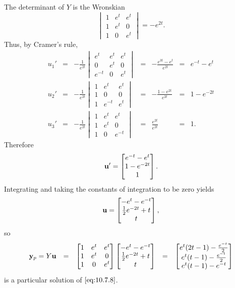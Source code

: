 \documentclass{ximera}
\begin{document}
\begin{example}
\begin{explanation}
$$$$
The determinant of $Y$  is the Wronskian
$$
\begin{vmatrix}1&e^t&e^t\\1&e^t&0\\1&0&e^t\end{vmatrix}
=-e^{2t}.
$$
Thus, by Cramer's rule,
$$
\begin{array}{cccccll}
u_1'&=&-\frac{1}{e^{2t}}\begin{vmatrix}e^t&e^t&e^t\\0&e^t&0\\e^{-t}&0&e^t
\end{vmatrix}&=&-\frac{e^{3t}-e^t}{e^{2t}}&=&e^{-t}-e^t\\ u_2'&=&-\frac{1}{e^{2t}}\begin{vmatrix}1&e^t&e^t\\1&0&0\\1&e^{-t}&e^t
\end{vmatrix}&=&-\frac{1-e^{2t}}{e^{2t}}&=&1-e^{-2t}\\
u_3'&=&-\frac{1}{e^{2t}}\begin{vmatrix}1&e^t&e^t\\1&e^t&0\\1&0&e^{-t}
\end{vmatrix}&=&\frac{e^{2t}}{e^{2t}}&=&1.
\end{array}
$$
 Therefore
$$
{\bf u}'=\begin{bmatrix}e^{-t}-e^t\\1-e^{-2t}\\1\end{bmatrix}.
$$
Integrating and taking the constants of integration to be zero yields
$$
{\bf
u}=\begin{bmatrix}-e^t-e^{-t}\\\frac{1}{2}e^{-2t}+t
\\t\end{bmatrix},
$$
so
$$
\begin{array}{ccccl}
{\bf y}_p=Y{\bf u}&=&
\begin{bmatrix}1&e^t&e^t\\1&e^t&0\\1&0&e^t\end{bmatrix}
\begin{bmatrix}-e^t-e^{-t}\\\frac{1}{2}e^{-2t}+t\\t\end{bmatrix}
&=&\begin{bmatrix}e^t(2t-1)-\frac{e^{-t}}{2}\\
e^t(t-1)-\frac{e^{-t}}{2}\\
e^t(t-1)-e^{-t}
\end{bmatrix}
\end{array}
$$
is a particular solution of  $\eqref{eq:10.7.8}$.


\end{explanation}
\end{example}
\end{document}
